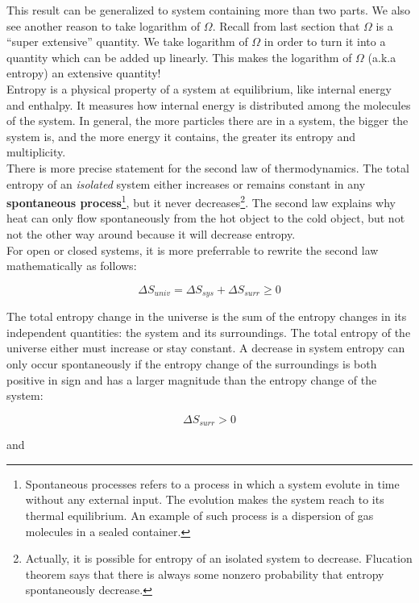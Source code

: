 This result can be generalized to system containing more than two parts. We also see another reason to take logarithm of $\Omega$. Recall from last section that $\Omega$ is a ``super extensive'' quantity. We take logarithm of $\Omega$ in order to turn it into a quantity which can be added up linearly. This makes the logarithm of $\Omega$ (a.k.a entropy) an extensive quantity! \\

Entropy is a physical property of a system at equilibrium, like internal energy and enthalpy. It measures how internal energy is distributed among the molecules of the system. In general, the more particles there are in a system, the bigger the system is, and the more energy it contains, the greater its entropy and multiplicity. \\

There is more precise statement for the second law of thermodynamics. The total entropy of an \textit{isolated} system either increases or remains constant in any \textbf{spontaneous process}\footnote{Spontaneous processes refers to a process in which a system evolute in time without any external input. The evolution makes the system reach to its thermal equilibrium. An example of such process is a dispersion of gas molecules in a sealed container.}, but it never decreases\footnote{Actually, it is possible for entropy of an isolated system to decrease. Flucation theorem says that there is always some nonzero probability that entropy spontaneously decrease.}. The second law explains why heat can only flow spontaneously from the hot object to the cold object, but not not the other way around because it will decrease entropy. \\

For open or closed systems, it is more preferrable to rewrite the second law mathematically as follows:

\[ \Delta S_{univ} = \Delta S_{sys} + \Delta S_{surr} \ge 0 \]

The total entropy change in the universe is the sum of the entropy changes in its independent quantities: the system and its surroundings. The total entropy of the universe either must increase or stay constant. A decrease in system entropy can only occur spontaneously if the entropy change of the surroundings is both positive in sign and has a larger magnitude than the entropy change of the system:

\[\Delta S_{surr} > 0\]

and

